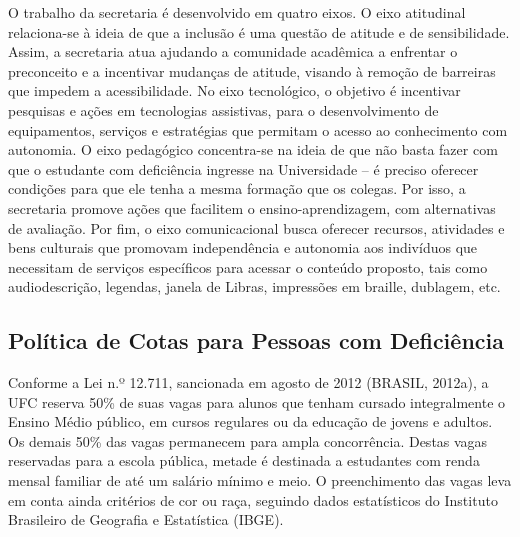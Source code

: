 
O trabalho da secretaria é desenvolvido em quatro eixos. O eixo atitudinal relaciona-se à ideia de que a inclusão é uma questão de atitude e de sensibilidade. Assim, a secretaria atua ajudando a comunidade acadêmica a enfrentar o preconceito e a incentivar mudanças de atitude, visando à remoção de barreiras que impedem a acessibilidade. No eixo tecnológico, o objetivo é incentivar pesquisas e ações em tecnologias assistivas, para o desenvolvimento de equipamentos, serviços e estratégias que permitam o acesso ao conhecimento com autonomia. O eixo pedagógico concentra-se na ideia de que não basta fazer com que o estudante com deficiência ingresse na Universidade – é preciso oferecer condições para que ele tenha a mesma formação que os colegas. Por isso, a secretaria promove ações que facilitem o ensino-aprendizagem, com alternativas de avaliação. Por fim, o eixo comunicacional busca oferecer recursos, atividades e bens culturais que promovam independência e autonomia aos indivíduos que necessitam de serviços específicos para acessar o conteúdo proposto, tais como audiodescrição, legendas, janela de Libras, impressões em braille, dublagem, etc.

\subsection{Política de Cotas para Pessoas com Deficiência}
Conforme a Lei n.º 12.711, sancionada em agosto de 2012 (BRASIL, 2012a), a UFC reserva 50\% de suas vagas para alunos que tenham cursado integralmente o Ensino Médio público, em cursos regulares ou da educação de jovens e adultos. Os demais 50\% das vagas permanecem para ampla concorrência. Destas vagas reservadas para a escola pública, metade é destinada a estudantes com renda mensal familiar de até um salário mínimo e meio. O preenchimento das vagas leva em conta ainda critérios de cor ou raça, seguindo dados estatísticos do Instituto Brasileiro de Geografia e Estatística (IBGE).

